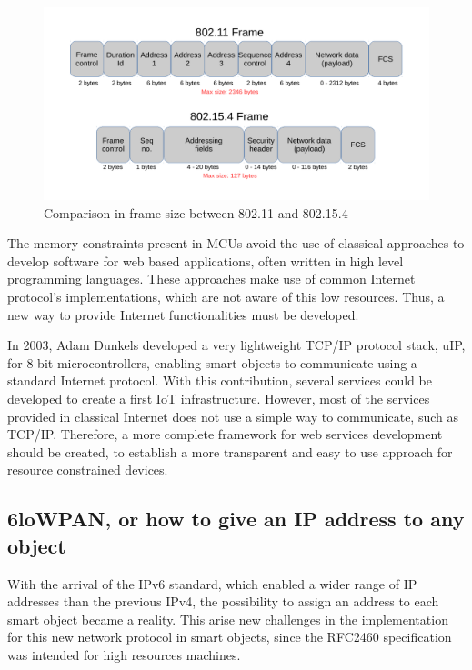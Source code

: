 \begin{figure}[htb]
	\centering
	\includegraphics[width=1\columnwidth]{chapters/background.images/FramesComparison.pdf}
	\caption{Comparison in frame size between 802.11 and 802.15.4}
	\label{fig:FramesComparison}
\end{figure}

The memory constraints present in MCUs avoid the use of classical approaches to develop software for web based applications, often written in high level programming languages.
These approaches make use of common Internet protocol's implementations, which are not aware of this low resources.
Thus, a new way to provide Internet functionalities must be developed.

In 2003, Adam Dunkels developed a very lightweight TCP/IP protocol stack, uIP\cite{dunkels03full}, for 8-bit microcontrollers, enabling smart objects to communicate using a standard Internet protocol.
With this contribution, several services could be developed to create a first IoT infrastructure.
However, most of the services provided in classical Internet does not use a simple way to communicate, such as TCP/IP.
Therefore, a more complete framework for web services development should be created, to establish a more transparent and easy to use approach for resource constrained devices.

\subsection{6loWPAN, or how to give an IP address to any object}
With the arrival of the IPv6 standard\cite{rfc2460}, which enabled a wider range of IP addresses than the previous IPv4, the possibility to assign an address to each smart object became a reality.
This arise new challenges in the implementation for this new network protocol in smart objects, since the RFC2460 specification was intended for high resources machines.

